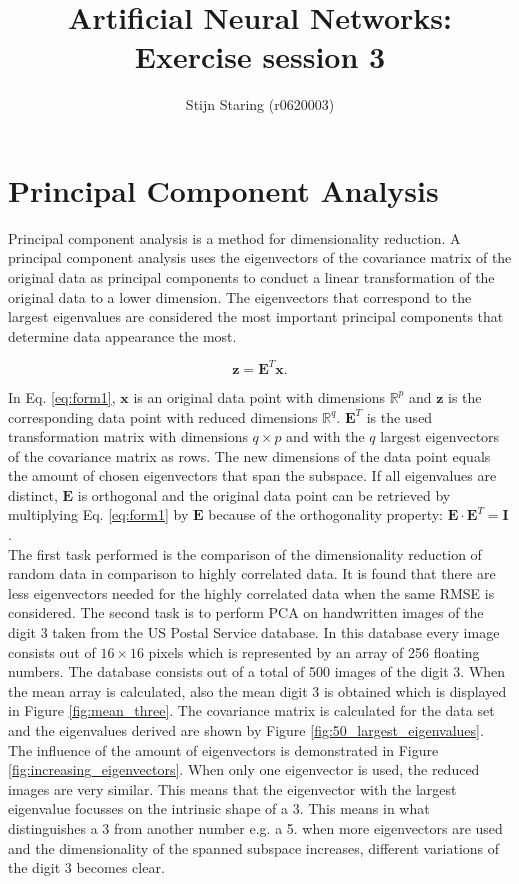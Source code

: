 \documentclass[a4paper,10pt]{article}
\title{Artificial Neural Networks: Exercise session 3}
\author{Stijn Staring (r0620003)}
\begin{document}
\selectfont{}

\maketitle


\section{Principal Component Analysis}
Principal component analysis is a method for dimensionality reduction. A principal component analysis uses the eigenvectors of the covariance matrix of the original data as principal components to conduct a linear transformation of the original data to a lower dimension. The eigenvectors that correspond to the largest eigenvalues are considered the most important principal components that determine data appearance the most.

\begin{equation}\label{eq:form1}
	\bm{z} = \bm{E}^T\bm{x}.
\end{equation}

In Eq. \ref{eq:form1}, $ \bm{x} $ is an original data point with dimensions $ \mathbb{R}^p $ and $ \bm{z} $ is the corresponding data point with reduced dimensions $ \mathbb{R}^q $. $ \bm{E}^T $ is the used transformation matrix with dimensions $ q \times p $ and with the $ q $ largest eigenvectors of the covariance matrix as rows. The new dimensions of the data point equals the amount of chosen eigenvectors that span the subspace. If all eigenvalues are distinct, $ \bm{E} $ is orthogonal and the original data point can be retrieved by multiplying Eq. \ref{eq:form1} by $ \bm{E} $ because of the orthogonality property: $ \bm{E}\cdot \bm{E}^{T} = \bm{I} $.\\

The first task performed is the comparison of the dimensionality reduction of random data in comparison to highly correlated data. It is found that there are less eigenvectors needed for the highly correlated data when the same RMSE is considered. The second task is to perform PCA on handwritten images of the digit 3 taken from the US Postal Service database. In this database every image consists out of $ 16 \times 16 $ pixels which is represented by an array of 256 floating numbers. The database consists out of a total of 500 images of the digit 3. When the mean array is calculated, also the mean digit 3 is obtained which is displayed in Figure \ref{fig:mean_three}. The covariance matrix is calculated for the data set and the eigenvalues derived are shown by Figure \ref{fig:50_largest_eigenvalues}. The influence of the amount of eigenvectors is demonstrated in Figure \ref{fig:increasing_eigenvectors}. When only one eigenvector is used, the reduced images are very similar. This means that the eigenvector with the largest eigenvalue focusses on the intrinsic shape of a 3. This means in what distinguishes a 3 from another number e.g. a 5. when more eigenvectors are used and the dimensionality of the spanned subspace increases, different variations of the digit 3 becomes clear. 
\end{document}
